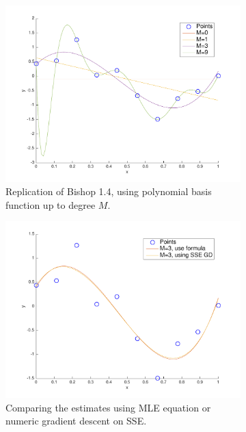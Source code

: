 \begin{figure}[h!]
\centering
    \begin{subfigure}[b]{0.4\textwidth}
	\includegraphics[scale=0.4]{hw1_2.pdf}
	\caption{Replication of Bishop 1.4, using polynomial basis function up to degree $M$.}\label{fig:bishop_poly_fit}
    \end{subfigure}
    \quad
    \begin{subfigure}[b]{0.4\textwidth}
	\includegraphics[scale=0.4]{hw1_2_2.pdf}
	\caption{Comparing the estimates using MLE equation or numeric gradient descent on SSE.}\label{fig:bishop_SSE_GD}
    \end{subfigure}
    \quad
    \begin{subfigure}[b]{0.4\textwidth}

\end{subfigure}
\end{figure}
